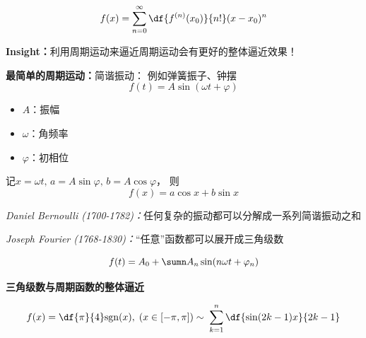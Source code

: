 $${f(x)=\sum\limits_{n=0}^{\infty}\df{f^{(n)}(x_0)}{n!}(x-x_0)^n}$$
\begin{center}
\end{center}

{\bf Insight：}利用周期运动来逼近周期运动会有更好的整体逼近效果！

{\bf 最简单的周期运动：}{\bb 简谐振动：} 例如弹簧振子、钟摆
$$f(t)=A\sin(\omega t+\varphi)$$
\begin{itemize} 
  \item { $A$：}振幅 
  \item { $\omega$：}角频率 
  \item { $\varphi$：}初相位 
\end{itemize}
记$x=\omega t,\,a=A\sin\varphi,\,b=A\cos\varphi$， 则
$${f(x)=a\cos x+b\sin x}$$

{\it Daniel Bernoulli (1700-1782)：}任何复杂的振动都可以分解成一系列简谐振动之和

{\it Joseph Fourier (1768-1830)：}“任意”函数都可以展开成三角级数

$${f(t)=A_0+\sumn A_n\sin(n\omega t+\varphi_n)}$$

{\bf 三角级数与周期函数的整体逼近}

$${f(x)=\df{\pi}{4}\mathrm{sgn}(x),\;(x\in[-\pi,\pi])
\;{\sim\;\sum\limits_{k=1}^n\df{\sin(2k-1)x}{2k-1}}}$$

